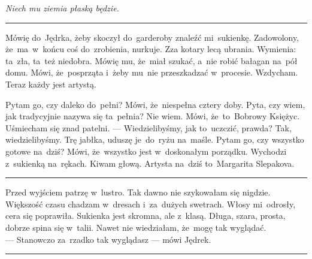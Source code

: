 \documentclass[9pt, a5paper]{memoir}
\begin{document}
\noindent
\textit{Niech mu ziemia płaską będzie.}

\fancybreak{* \quad * \quad *}

Mówię do~Jędrka, żeby skoczył do~garderoby znaleźć mi~sukienkę. Zadowolony, że~ma~w~końcu coś do~zrobienia, nurkuje. Zza kotary lecą ubrania. Wymienia: ta~zła, ta~też niedobra. Mówię mu, że~miał szukać, a~nie robić bałagan na~pół domu. Mówi, że~posprząta i~żeby mu~nie przeszkadzać w~procesie. Wzdycham. Teraz każdy jest artystą.

Pytam go, czy daleko do~pełni? Mówi, że~niespełna cztery doby. Pyta, czy wiem, jak tradycyjnie nazywa się ta~pełnia? Nie wiem. Mówi, że~to~Bobrowy Księżyc. Uśmiecham się znad patelni. --- Wiedzielibyśmy, jak to~uczczić, prawda? Tak, wiedzielibyśmy. Trę jabłka, uduszę je~do~ryżu na~maśle. Pytam go, czy wszystko gotowe na~dziś? Mówi, że~wszystko jest w~doskonałym porządku. Wychodzi z~sukienką na~rękach. Kiwam głową. Artysta na~dziś to~Margarita Slepakova.

\fancybreak{* \quad * \quad *}

Przed wyjściem patrzę w~lustro. Tak dawno nie szykowałam się nigdzie. Większość czasu chadzam w~dresach i~za~dużych swetrach. Włosy mi~odrosły, cera się poprawiła. Sukienka jest skromna, ale z~klasą. Długa, szara, prosta, dobrze spina się w~talii. Nawet nie wiedziałam, że~mogę tak wyglądać.\\
--- Stanowczo za~rzadko tak wyglądasz --- mówi Jędrek.

\fancybreak{* \quad * \quad *}
\end{document}
